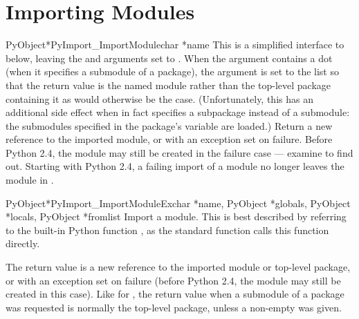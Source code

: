 \section{Importing Modules \label{importing}}

\begin{cfuncdesc}{PyObject*}{PyImport_ImportModule}{char *name}
  This is a simplified interface to
   below, leaving the
   and  arguments set to \NULL.  When the
   argument contains a dot (when it specifies a submodule of
  a package), the  argument is set to the list
  \code{['*']} so that the return value is the named module rather
  than the top-level package containing it as would otherwise be the
  case.  (Unfortunately, this has an additional side effect when
   in fact specifies a subpackage instead of a submodule:
  the submodules specified in the package's  variable
  are 
  loaded.)  Return
  a new reference to the imported module, or \NULL{} with an exception
  set on failure.  Before Python 2.4, the module may still be created in
  the failure case --- examine  to find out.  Starting
  with Python 2.4, a failing import of a module no longer leaves the
  module in .
\end{cfuncdesc}

\begin{cfuncdesc}{PyObject*}{PyImport_ImportModuleEx}{char *name,
                       PyObject *globals, PyObject *locals, PyObject *fromlist}
  Import a module.  This is best described by referring to the
  built-in Python function
  , as the standard
   function calls this function directly.

  The return value is a new reference to the imported module or
  top-level package, or \NULL{} with an exception set on failure (before
  Python 2.4, the
  module may still be created in this case).  Like for
  , the return value when a submodule of a
  package was requested is normally the top-level package, unless a
  non-empty  was given.
\end{cfuncdesc}


